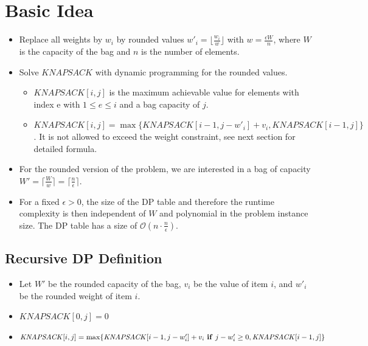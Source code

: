 \documentclass[12pt]{article}
\begin{document}
\section*{Basic Idea}
\begin{itemize}
	\item Replace all weights by $w_i$ by rounded values $w'_i = \lfloor \frac{w_i}{w} \rfloor$ with $w = \frac{\epsilon W}{n}$, where $W$ is the capacity of the bag and $n$ is the number of elements.
	\item Solve $\mathit{KNAPSACK}$ with dynamic programming for the rounded values.
	\begin{itemize}
		\item $\mathit{KNAPSACK}[i, j]$ is the maximum achievable value for elements with index e with $1 \leq e \leq i$ and a bag capacity of $j$.
		\item $\mathit{KNAPSACK}[i, j] = \max \{\mathit{KNAPSACK}[i-1, j-w'_i] + v_i, \mathit{KNAPSACK}[i-1, j] \}$. It is not allowed to exceed the weight constraint, see next section for detailed formula.
	\end{itemize}
	\item For the rounded version of the problem, we are interested in a bag of capacity $W' = \lceil \frac{W}{w} \rceil =\lceil \frac{n}{\epsilon} \rceil$.
	\item For a fixed $\epsilon > 0$, the size of the DP table and therefore the runtime complexity is then independent of $W$ and polynomial in the problem instance size. The DP table has a size of $\mathcal{O}(n \cdot \frac{n}{\epsilon})$.
\end{itemize}

\subsection*{Recursive DP Definition}
\begin{itemize}
	\item Let $W'$ be the rounded capacity of the bag, $v_i$ be the value of item $i$, and $w'_i$ be the rounded weight of item $i$.
	\item $\mathit{KNAPSACK}[0, j] = 0$
	\item $\mathit{KNAPSACK}[i, j] = \max \{\mathit{KNAPSACK}[i-1, j-w'_i] + v_i \mbox{ \textbf{if} } j-w'_i \geq 0, \mathit{KNAPSACK}[i-1, j] \}$
\end{itemize}
\end{document}
